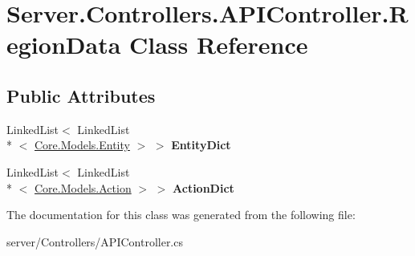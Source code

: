 \hypertarget{classServer_1_1Controllers_1_1APIController_1_1RegionData}{\section{Server.\-Controllers.\-A\-P\-I\-Controller.\-Region\-Data Class Reference}
\label{classServer_1_1Controllers_1_1APIController_1_1RegionData}
}
\subsection*{Public Attributes}
\begin{DoxyCompactItemize}
\item 
\hypertarget{classServer_1_1Controllers_1_1APIController_1_1RegionData_a515c8be86ead173ab0e21c57a93cd174}{Linked\-List$<$ Linked\-List\\*
$<$ \hyperlink{classCore_1_1Models_1_1Entity}{Core.\-Models.\-Entity} $>$ $>$ {\bfseries Entity\-Dict}}\label{classServer_1_1Controllers_1_1APIController_1_1RegionData_a515c8be86ead173ab0e21c57a93cd174}

\item 
\hypertarget{classServer_1_1Controllers_1_1APIController_1_1RegionData_a15b7109e6735a6e66ed251c195aaf937}{Linked\-List$<$ Linked\-List\\*
$<$ \hyperlink{classCore_1_1Models_1_1Action}{Core.\-Models.\-Action} $>$ $>$ {\bfseries Action\-Dict}}\label{classServer_1_1Controllers_1_1APIController_1_1RegionData_a15b7109e6735a6e66ed251c195aaf937}

\end{DoxyCompactItemize}


The documentation for this class was generated from the following file\-:\begin{DoxyCompactItemize}
\item 
server/\-Controllers/A\-P\-I\-Controller.\-cs\end{DoxyCompactItemize}
